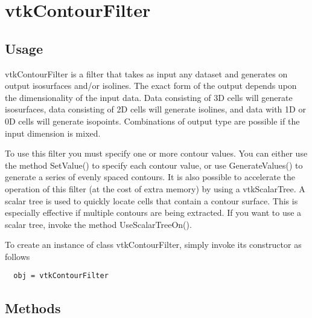 \section{vtkContourFilter}

\subsection{Usage}

 vtkContourFilter is a filter that takes as input any dataset and 
 generates on output isosurfaces and/or isolines. The exact form 
 of the output depends upon the dimensionality of the input data. 
 Data consisting of 3D cells will generate isosurfaces, data 
 consisting of 2D cells will generate isolines, and data with 1D 
 or 0D cells will generate isopoints. Combinations of output type 
 are possible if the input dimension is mixed.

 To use this filter you must specify one or more contour values.
 You can either use the method SetValue() to specify each contour
 value, or use GenerateValues() to generate a series of evenly
 spaced contours. It is also possible to accelerate the operation of
 this filter (at the cost of extra memory) by using a
 vtkScalarTree. A scalar tree is used to quickly locate cells that
 contain a contour surface. This is especially effective if multiple
 contours are being extracted. If you want to use a scalar tree,
 invoke the method UseScalarTreeOn().

To create an instance of class vtkContourFilter, simply
invoke its constructor as follows
\begin{verbatim}
  obj = vtkContourFilter
\end{verbatim}
\subsection{Methods}

